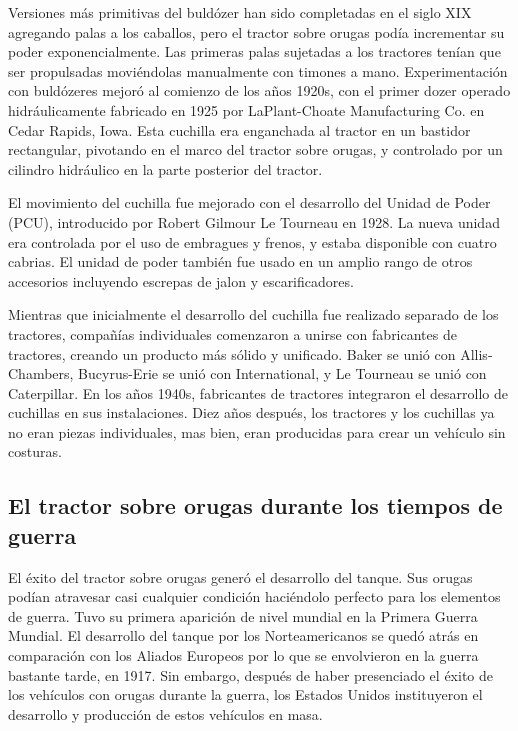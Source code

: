 Versiones más primitivas del buldózer han sido completadas en el siglo
XIX agregando palas a los caballos, pero el tractor sobre orugas podía
incrementar su poder exponencialmente. Las primeras palas sujetadas a
los tractores tenían que ser propulsadas moviéndolas manualmente con
timones a mano. Experimentación con buldózeres mejoró al comienzo de
los años 1920s, con el primer dozer operado hidráulicamente fabricado
en 1925 por LaPlant-Choate Manufacturing Co. en Cedar Rapids,
Iowa. Esta cuchilla era enganchada al tractor en un bastidor
rectangular, pivotando en el marco del tractor sobre orugas, y
controlado por un cilindro hidráulico en la parte posterior del
tractor.

El movimiento del cuchilla fue mejorado con el desarrollo del Unidad
de Poder (PCU), introducido por Robert Gilmour Le Tourneau en 1928. La
nueva unidad era controlada por el uso de embragues y frenos, y estaba
disponible con cuatro cabrias. El unidad de poder también fue usado en
un amplio rango de otros accesorios incluyendo escrepas de jalon y
escarificadores.

Mientras que inicialmente el desarrollo del cuchilla fue realizado
separado de los tractores, compañías individuales comenzaron a unirse
con fabricantes de tractores, creando un producto más sólido y
unificado. Baker se unió con Allis-Chambers, Bucyrus-Erie se unió con
International, y Le Tourneau se unió con Caterpillar. En los años
1940s, fabricantes de tractores integraron el desarrollo de cuchillas
en sus instalaciones. Diez años después, los tractores y los cuchillas
ya no eran piezas individuales, mas bien, eran producidas para crear
un vehículo sin costuras.

\subsection*{El tractor sobre orugas durante los tiempos de guerra}

El éxito del tractor sobre orugas generó el desarrollo del tanque. Sus
orugas podían atravesar casi cualquier condición haciéndolo perfecto
para los elementos de guerra. Tuvo su primera aparición de nivel
mundial en la Primera Guerra Mundial. El desarrollo del tanque por los
Norteamericanos se quedó atrás en comparación con los Aliados Europeos
por lo que se envolvieron en la guerra bastante tarde, en 1917. Sin
embargo, después de haber presenciado el éxito de los vehículos con
orugas durante la guerra, los Estados Unidos instituyeron el
desarrollo y producción de estos vehículos en masa.

